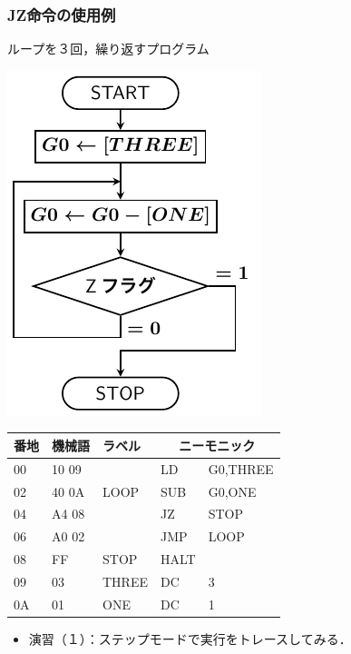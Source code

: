 \documentclass{beamer}                 %
\begin{document}
\begin{frame}
  \frametitle{JZ命令の使用例}
  ループを３回，繰り返すプログラム\\
  \vfill
  \begin{minipage}{0.4\columnwidth}
    \centerline{\includegraphics[scale=0.7]{../Tikz/flow0B.pdf}}
  \end{minipage}
  \begin{minipage}{0.59\columnwidth}
    {\ttfamily\small\begin{center}
      \begin{tabular}{|l|l|l|l l|} \hline
        番地 & 機械語 & ラベル & \multicolumn{2}{|c|}{ニーモニック} \\
        \hline
        00 & 10 09 &           & LD   & G0,THREE              \\
        02 & 40 0A &  LOOP     & SUB  & G0,ONE                \\
        04 & A4 08 &           & JZ   & STOP                  \\
        06 & A0 02 &           & JMP  & LOOP                  \\
        08 & FF    &  STOP     & HALT &                       \\
        09 & 03    &  THREE    & DC   & 3                     \\
        0A & 01    &  ONE      & DC   & 1                     \\
        \hline
      \end{tabular}
    \end{center}}
  \end{minipage}
  \vfill
  \begin{itemize}
  \item 演習（１）：ステップモードで実行をトレースしてみる．
  \end{itemize}
\end{frame}
\end{document}
